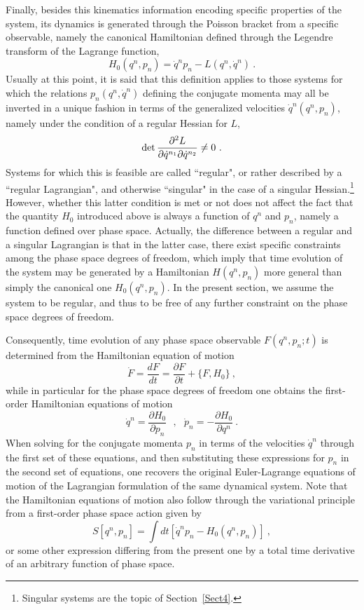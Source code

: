 \documentclass[a4paper,11pt]{article}
\begin{document}
Finally, besides this kinematics information encoding specific
properties of the system, its dynamics is generated through the Poisson
bracket from a specific observable, namely the canonical Hamiltonian defined
through the Legendre transform of the Lagrange function,
\begin{equation}
H_0(q^n,p_n)=\dot{q}^np_n-L(q^n,\dot{q}^n)\ .
\end{equation}
Usually at this point, it is said that this definition applies to
those systems for which the relations $p_n(q^n,\dot{q}^n)$ defining
the conjugate momenta may all be inverted in a unique fashion in
terms of the generalized velocities $\dot{q}^n(q^n,p_n)$, namely
under the condition of a regular Hessian for $L$,
\begin{equation}
{\rm det}\,\frac{\partial^2 L}{\partial\dot{q}^{n_1}
\partial\dot{q}^{n_2}}\ne 0\ .
\label{eq:regular}
\end{equation}
Systems for which this is feasible are called ``regular", or rather
described by a ``regular Lagrangian", and otherwise ``singular" in the
case of a singular Hessian.\footnote{Singular systems are the topic of 
Section~\ref{Sect4}.} However, whether this latter condition is met or 
not does not affect the fact that the quantity $H_0$ introduced above is 
always\cite{JG1} a function of $q^n$ and $p_n$, namely a function defined over 
phase space. Actually, the difference between a regular and a singular 
Lagrangian is that in the latter case, there exist specific constraints 
among the phase space degrees of freedom, which imply that time evolution 
of the system may be generated by a Hamiltonian $H(q^n,p_n)$ more general
than simply the canonical one $H_0(q^n,p_n)$. In the present section,
we assume the system to be regular, and thus to be free of any
further constraint on the phase space degrees of freedom.

Consequently, time evolution of any phase space observable $F(q^n,p_n;t)$
is determined from the Hamiltonian equation of motion
\begin{equation}
\dot{F}=\frac{dF}{dt}=\frac{\partial F}{\partial t}+\{F,H_0\}\ ,
\end{equation}
while in particular for the phase space degrees of freedom one obtains
the first-order Hamiltonian equations of motion
\begin{equation}
\dot{q}^n=\frac{\partial H_0}{\partial p_n}\ \ \ ,\ \ \ 
\dot{p}_n=-\frac{\partial H_0}{\partial q^n}\ .
\end{equation}
When solving for the conjugate momenta $p_n$ in terms of the velocities
$\dot{q}^n$ through the first set of these equations, and then substituting
these expressions for $p_n$ in the second set of equations, one recovers the
original Euler-Lagrange equations of motion of the Lagrangian formulation
of the same dynamical system. Note that the Hamiltonian equations
of motion also follow through the variational principle from a first-order
phase space action given by
\begin{equation}
S[q^n,p_n]=\int dt\left[\dot{q}^np_n-H_0(q^n,p_n)\right]\ ,
\label{eq:firstorderaction}
\end{equation}
or some other expression differing from the present one by a total
time derivative of an arbitrary function of phase space.
\end{document}
